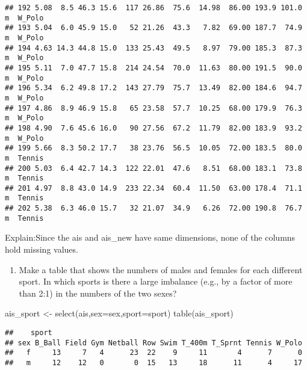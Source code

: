 \documentclass[
]{article}
\newenvironment{Shaded}{\begin{snugshade}}{\end{snugshade}}
\newcommand{\AttributeTok}[1]{\textcolor[rgb]{0.77,0.63,0.00}{#1}}
\newcommand{\FunctionTok}[1]{\textcolor[rgb]{0.00,0.00,0.00}{#1}}
\newcommand{\NormalTok}[1]{#1}
\newcommand{\OtherTok}[1]{\textcolor[rgb]{0.56,0.35,0.01}{#1}}
\providecommand{\tightlist}{%
  \setlength{\itemsep}{0pt}\setlength{\parskip}{0pt}}
\begin{document}
\begin{verbatim}
## 192 5.08  8.5 46.3 15.6  117 26.86  75.6  14.98  86.00 193.9 101.0   m  W_Polo
## 193 5.04  6.0 45.9 15.0   52 21.26  43.3   7.82  69.00 187.7  74.9   m  W_Polo
## 194 4.63 14.3 44.8 15.0  133 25.43  49.5   8.97  79.00 185.3  87.3   m  W_Polo
## 195 5.11  7.0 47.7 15.8  214 24.54  70.0  11.63  80.00 191.5  90.0   m  W_Polo
## 196 5.34  6.2 49.8 17.2  143 27.79  75.7  13.49  82.00 184.6  94.7   m  W_Polo
## 197 4.86  8.9 46.9 15.8   65 23.58  57.7  10.25  68.00 179.9  76.3   m  W_Polo
## 198 4.90  7.6 45.6 16.0   90 27.56  67.2  11.79  82.00 183.9  93.2   m  W_Polo
## 199 5.66  8.3 50.2 17.7   38 23.76  56.5  10.05  72.00 183.5  80.0   m  Tennis
## 200 5.03  6.4 42.7 14.3  122 22.01  47.6   8.51  68.00 183.1  73.8   m  Tennis
## 201 4.97  8.8 43.0 14.9  233 22.34  60.4  11.50  63.00 178.4  71.1   m  Tennis
## 202 5.38  6.3 46.0 15.7   32 21.07  34.9   6.26  72.00 190.8  76.7   m  Tennis
\end{verbatim}

Explain:Since the ais and ais\_new have same dimensions, none of the
columns hold missing values.

\begin{enumerate}
\def\labelenumi{(\alph{enumi})}
\setcounter{enumi}{1}
\tightlist
\item
  Make a table that shows the numbers of males and females for each
  different sport. In which sports is there a large imbalance (e.g., by
  a factor of more than 2:1) in the numbers of the two sexes?
\end{enumerate}

\begin{Shaded}
\begin{Highlighting}[]
\NormalTok{ais\_sport }\OtherTok{\textless{}{-}} \FunctionTok{select}\NormalTok{(ais,}\AttributeTok{sex=}\NormalTok{sex,}\AttributeTok{sport=}\NormalTok{sport)}
\FunctionTok{table}\NormalTok{(ais\_sport)}
\end{Highlighting}
\end{Shaded}

\begin{verbatim}
##    sport
## sex B_Ball Field Gym Netball Row Swim T_400m T_Sprnt Tennis W_Polo
##   f     13     7   4      23  22    9     11       4      7      0
##   m     12    12   0       0  15   13     18      11      4     17
\end{verbatim}
\end{document}

